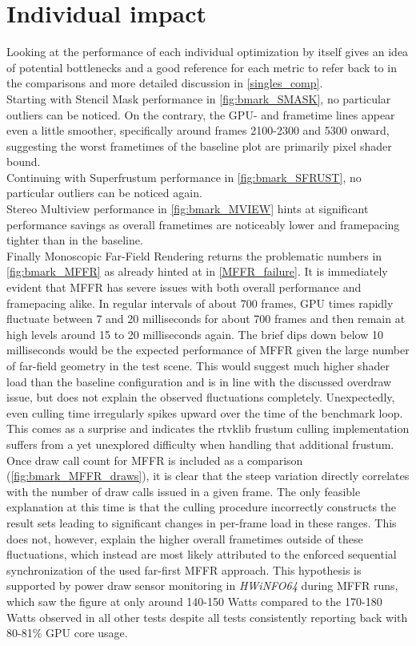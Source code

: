 \section{Individual impact} \label{individual_impact}
Looking at the performance of each individual optimization by itself gives an idea of potential bottlenecks and a good reference for each metric to refer back to in the comparisons and more detailed discussion in \autoref{singles_comp}. \\
Starting with Stencil Mask performance in \autoref{fig:bmark_SMASK}, no particular outliers can be noticed. On the contrary, the GPU- and frametime lines appear even a little smoother, specifically around frames 2100-2300 and 5300 onward, suggesting the worst frametimes of the baseline plot are primarily pixel shader bound. \\
Continuing with Superfrustum performance in \autoref{fig:bmark_SFRUST}, no particular outliers can be noticed again. \\
Stereo Multiview performance in \autoref{fig:bmark_MVIEW} hints at significant performance savings as overall frametimes are noticeably lower and framepacing tighter than in the baseline. \\
Finally Monoscopic Far-Field Rendering returns the problematic numbers in \autoref{fig:bmark_MFFR} as already hinted at in \autoref{MFFR_failure}. It is immediately evident that \gls{MFFR} has severe issues with both overall performance and framepacing alike. In regular intervals of about 700 frames, GPU times rapidly fluctuate between 7 and 20 milliseconds for about 700 frames and then remain at high levels around 15 to 20 milliseconds again. The brief dips down below 10 milliseconds would be the expected performance of MFFR given the large number of far-field geometry in the test scene. This would suggest much higher shader load than the baseline configuration and is in line with the discussed overdraw issue, but does not explain the observed fluctuations completely. 
Unexpectedly, even culling time irregularly spikes upward over the time of the benchmark loop. This comes as a surprise and indicates the \gls{rtvklib} frustum culling implementation suffers from a yet unexplored difficulty when handling that additional frustum. 
Once draw call count for MFFR is included as a comparison (\autoref{fig:bmark_MFFR_draws}), it is clear that the steep variation directly correlates with the number of draw calls issued in a given frame. The only feasible explanation at this time is that the culling procedure incorrectly constructs the result sets leading to significant changes in per-frame load in these ranges. This does not, however, explain the higher overall frametimes outside of these fluctuations, which instead are most likely attributed to the enforced sequential synchronization of the used far-first MFFR approach. This hypothesis is supported by power draw sensor monitoring in \textit{HWiNFO64} during \gls{MFFR} runs, which saw the figure at only around 140-150 Watts compared to the 170-180 Watts observed in all other tests despite all tests consistently reporting back with 80-81\% GPU core usage. 
